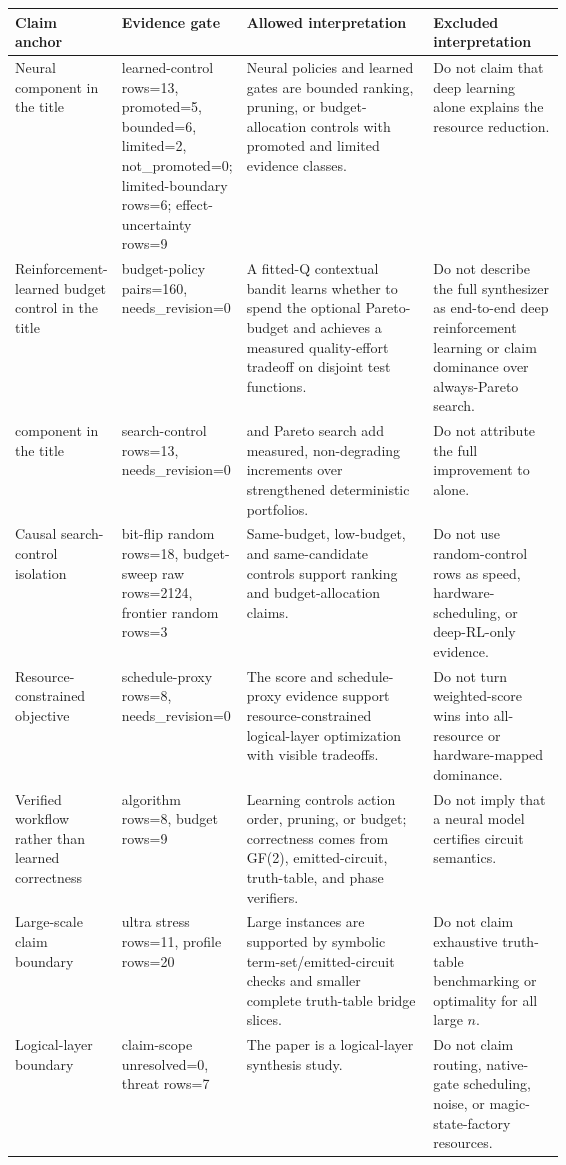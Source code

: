 \begin{tabularx}{\linewidth}{>{\raggedright\arraybackslash}p{0.18\linewidth}>{\raggedright\arraybackslash}p{0.22\linewidth}>{\raggedright\arraybackslash}X>{\raggedright\arraybackslash}p{0.24\linewidth}}
\toprule
Claim anchor & Evidence gate & Allowed interpretation & Excluded interpretation \\
\midrule
Neural component in the title & learned-control rows=13, promoted=5, bounded=6, limited=2, not\_promoted=0; limited-boundary rows=6; effect-uncertainty rows=9 & Neural policies and learned gates are bounded ranking, pruning, or budget-allocation controls with promoted and limited evidence classes. & Do not claim that deep learning alone explains the resource reduction. \\
Reinforcement-learned budget control in the title & budget-policy pairs=160, needs\_revision=0 & A fitted-Q contextual bandit learns whether to spend the optional Pareto-\mcts{} budget and achieves a measured quality-effort tradeoff on disjoint test functions. & Do not describe the full synthesizer as end-to-end deep reinforcement learning or claim dominance over always-Pareto search. \\
\mcts{} component in the title & search-control rows=13, needs\_revision=0 & \mcts{} and Pareto search add measured, non-degrading increments over strengthened deterministic portfolios. & Do not attribute the full improvement to \mcts{} alone. \\
Causal search-control isolation & bit-flip random rows=18, budget-sweep raw rows=2124, frontier random rows=3 & Same-budget, low-budget, and same-candidate controls support ranking and budget-allocation claims. & Do not use random-control rows as speed, hardware-scheduling, or deep-RL-only evidence. \\
Resource-constrained objective & schedule-proxy rows=8, needs\_revision=0 & The score and schedule-proxy evidence support resource-constrained logical-layer optimization with visible tradeoffs. & Do not turn weighted-score wins into all-resource or hardware-mapped dominance. \\
Verified workflow rather than learned correctness & algorithm rows=8, budget rows=9 & Learning controls action order, pruning, or budget; correctness comes from GF(2), emitted-circuit, truth-table, and phase verifiers. & Do not imply that a neural model certifies circuit semantics. \\
Large-scale claim boundary & ultra stress rows=11, profile rows=20 & Large instances are supported by symbolic term-set/emitted-circuit checks and smaller complete truth-table bridge slices. & Do not claim exhaustive truth-table benchmarking or optimality for all large $n$. \\
Logical-layer boundary & claim-scope unresolved=0, threat rows=7 & The paper is a logical-layer synthesis study. & Do not claim routing, native-gate scheduling, noise, or magic-state-factory resources. \\
\bottomrule
\end{tabularx}
